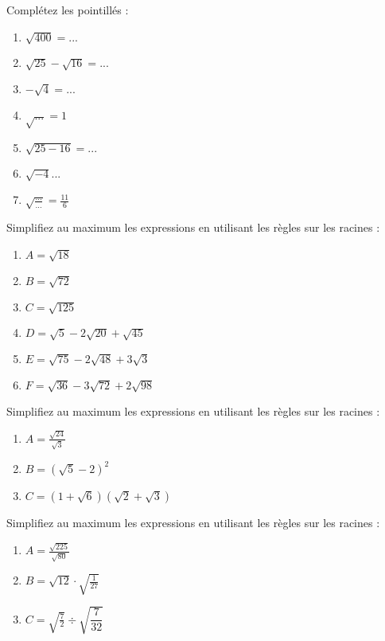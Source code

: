 

\begin{exercice}
Complétez les pointillés :
\begin{multicols}{2}
\begin{enumerate}
\item $\sqrt{400}=...$
\item $\sqrt{25}-\sqrt{16}=...$
\item $-\sqrt{4}=...$
\item $\sqrt{...}=1$
\item $\sqrt{25-16}=...$
\item $\sqrt{-4}...$
\item $\sqrt{\displaystyle\frac{...}{...}}=\displaystyle\frac{11}{6}$
\end{enumerate}
\end{multicols}

\end{exercice}

\begin{exercice}
Simplifiez au maximum les expressions en utilisant les règles sur les racines :
\begin{enumerate}
\item $A=\sqrt{18}$
\item $B=\displaystyle \sqrt{72}$
\item $C=\sqrt{125}$
\item $D=\sqrt{5}-2\sqrt{20}+\sqrt{45}$
\item $E=\sqrt{75}-2\sqrt{48}+3\sqrt{3}$
\item $F=\sqrt{36}-3\sqrt{72}+2\sqrt{98}$
\end{enumerate}
\end{exercice}

\begin{exercice}
Simplifiez au maximum les expressions en utilisant les règles sur les racines :
\begin{enumerate}
\item $A=\displaystyle \frac{\sqrt{24}}{\sqrt{3}}$
\item $B=(\sqrt{5}-2)^2$
\item $C=\displaystyle (1+\sqrt{6})(\sqrt{2}+\sqrt{3})$
\end{enumerate}
\end{exercice}

\begin{exercice}
Simplifiez au maximum les expressions en utilisant les règles sur les racines :
\begin{multicols}{2}
\begin{enumerate}
\item $A=\displaystyle\frac{\sqrt{225}}{\sqrt{80}}$
\item $B=\sqrt{12} \cdot \sqrt{\displaystyle\frac{1}{27}}$\\
\item $C=\sqrt{\displaystyle\frac{7}{2}} \div \sqrt{\displaystyle \dfrac{7}{32}}$
\end{enumerate}
\end{multicols}
\end{exercice}

